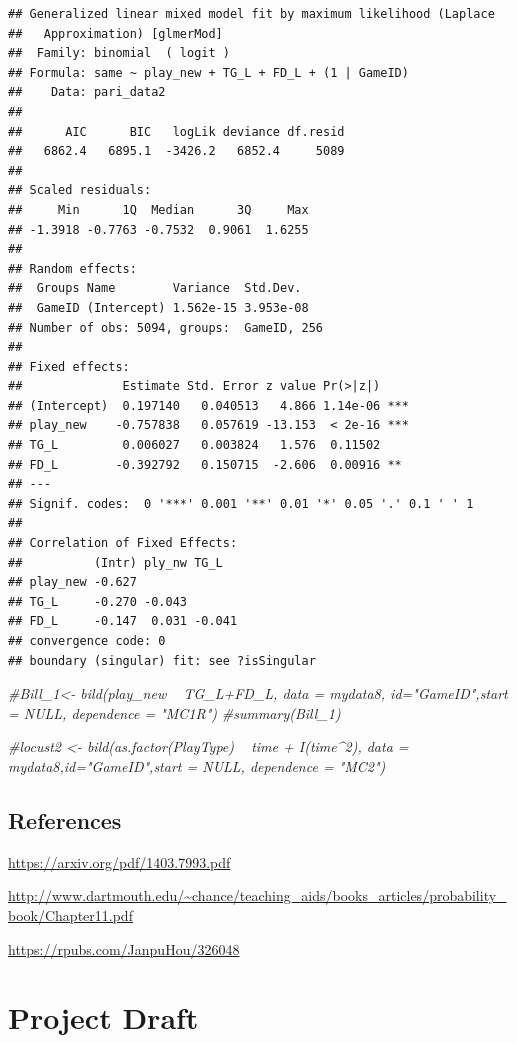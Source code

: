 \documentclass[]{book}
\newenvironment{Shaded}{\begin{snugshade}}{\end{snugshade}}
\newcommand{\CommentTok}[1]{\textcolor[rgb]{0.56,0.35,0.01}{\textit{#1}}}
\begin{document}
\begin{verbatim}
## Generalized linear mixed model fit by maximum likelihood (Laplace
##   Approximation) [glmerMod]
##  Family: binomial  ( logit )
## Formula: same ~ play_new + TG_L + FD_L + (1 | GameID)
##    Data: pari_data2
## 
##      AIC      BIC   logLik deviance df.resid 
##   6862.4   6895.1  -3426.2   6852.4     5089 
## 
## Scaled residuals: 
##     Min      1Q  Median      3Q     Max 
## -1.3918 -0.7763 -0.7532  0.9061  1.6255 
## 
## Random effects:
##  Groups Name        Variance  Std.Dev. 
##  GameID (Intercept) 1.562e-15 3.953e-08
## Number of obs: 5094, groups:  GameID, 256
## 
## Fixed effects:
##              Estimate Std. Error z value Pr(>|z|)    
## (Intercept)  0.197140   0.040513   4.866 1.14e-06 ***
## play_new    -0.757838   0.057619 -13.153  < 2e-16 ***
## TG_L         0.006027   0.003824   1.576  0.11502    
## FD_L        -0.392792   0.150715  -2.606  0.00916 ** 
## ---
## Signif. codes:  0 '***' 0.001 '**' 0.01 '*' 0.05 '.' 0.1 ' ' 1
## 
## Correlation of Fixed Effects:
##          (Intr) ply_nw TG_L  
## play_new -0.627              
## TG_L     -0.270 -0.043       
## FD_L     -0.147  0.031 -0.041
## convergence code: 0
## boundary (singular) fit: see ?isSingular
\end{verbatim}

\begin{Shaded}
\begin{Highlighting}[]
\CommentTok{#Bill_1<- bild(play_new ~ TG_L+FD_L, data = mydata8, id="GameID",start = NULL, dependence = "MC1R")}
\CommentTok{#summary(Bill_1)}

\CommentTok{#locust2 <- bild(as.factor(PlayType) ~ time + I(time^2), data = mydata8,id="GameID",start = NULL, dependence = "MC2")}
\end{Highlighting}
\end{Shaded}

\hypertarget{references-3}{%
\section{References}\label{references-3}}

\url{https://arxiv.org/pdf/1403.7993.pdf}

\url{http://www.dartmouth.edu/~chance/teaching_aids/books_articles/probability_book/Chapter11.pdf}

\url{https://rpubs.com/JanpuHou/326048}

\hypertarget{project-draft}{%
\chapter{Project Draft}\label{project-draft}}
\end{document}
